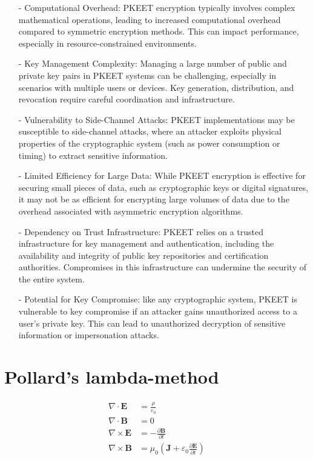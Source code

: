 \documentclass[12pt]{article}
\begin{document}
\begin{itemize}
    \item[-]Computational Overhead: PKEET encryption typically involves complex mathematical operations, leading to increased computational overhead compared to symmetric encryption methods. This can impact performance, especially in resource-constrained environments.
    \item[-]Key Management Complexity: Managing a large number of public and private key pairs in PKEET systems can be challenging, especially in scenarios with multiple users or devices. Key generation, distribution, and revocation require careful coordination and infrastructure.
    \item[-]Vulnerability to Side-Channel Attacks: PKEET implementations may be susceptible to side-channel attacks, where an attacker exploits physical properties of the cryptographic system (such as power consumption or timing) to extract sensitive information.
    \item[-]Limited Efficiency for Large Data: While PKEET encryption is effective for securing small pieces of data, such as cryptographic keys or digital signatures, it may not be as efficient for encrypting large volumes of data due to the overhead associated with asymmetric encryption algorithms.
    \item[-]Dependency on Trust Infrastructure: PKEET relies on a trusted infrastructure for key management and authentication, including the availability and integrity of public key repositories and certification authorities. Compromises in this infrastructure can undermine the security of the entire system.
    \item[-]Potential for Key Compromise: like any cryptographic system, PKEET is vulnerable to key compromise if an attacker gains unauthorized access to a user's private key. This can lead to unauthorized decryption of sensitive information or impersonation attacks.
\end{itemize}
\section{Pollard’s lambda-method}


\begin{align*}
\nabla \cdot \mathbf{E} &= \frac{\rho}{\varepsilon_0} \\
\nabla \cdot \mathbf{B} &= 0 \\
\nabla \times \mathbf{E} &= -\frac{\partial \mathbf{B}}{\partial t} \\
\nabla \times \mathbf{B} &= \mu_0 \left( \mathbf{J} + \varepsilon_0 \frac{\partial \mathbf{E}}{\partial t} \right)
\end{align*}
\end{document}
